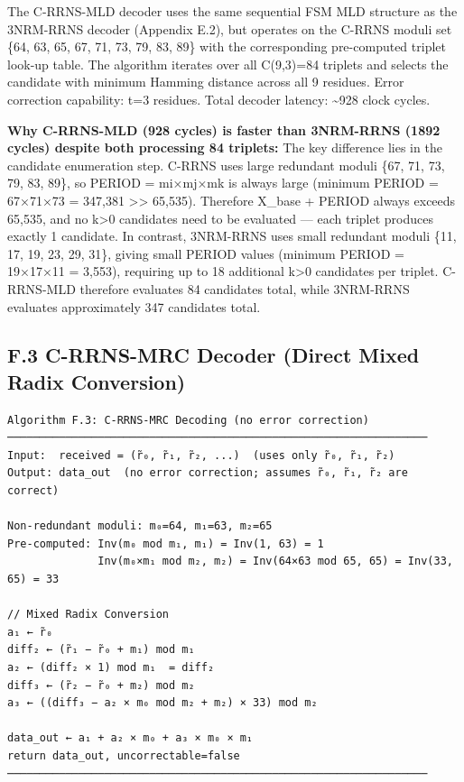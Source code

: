 \documentclass[
  english,
  12pt,
]{report}
\begin{document}
The C-RRNS-MLD decoder uses the same sequential FSM MLD structure as the
3NRM-RRNS decoder (Appendix E.2), but operates on the C-RRNS moduli set
\{64, 63, 65, 67, 71, 73, 79, 83, 89\} with the corresponding
pre-computed triplet look-up table. The algorithm iterates over all
C(9,3)=84 triplets and selects the candidate with minimum Hamming
distance across all 9 residues. Error correction capability: t=3
residues. Total decoder latency: \textasciitilde928 clock cycles.

\textbf{Why C-RRNS-MLD (928 cycles) is faster than 3NRM-RRNS (1892
cycles) despite both processing 84 triplets:} The key difference lies in
the candidate enumeration step. C-RRNS uses large redundant moduli \{67,
71, 73, 79, 83, 89\}, so PERIOD = mi×mj×mk is always large (minimum
PERIOD = 67×71×73 = 347,381 \textgreater\textgreater{} 65,535).
Therefore X\_base + PERIOD always exceeds 65,535, and no k\textgreater0
candidates need to be evaluated --- each triplet produces exactly 1
candidate. In contrast, 3NRM-RRNS uses small redundant moduli \{11, 17,
19, 23, 29, 31\}, giving small PERIOD values (minimum PERIOD = 19×17×11
= 3,553), requiring up to 18 additional k\textgreater0 candidates per
triplet. C-RRNS-MLD therefore evaluates 84 candidates total, while
3NRM-RRNS evaluates approximately 347 candidates total.

\subsection{F.3 C-RRNS-MRC Decoder (Direct Mixed Radix
Conversion)}\label{f.3-c-rrns-mrc-decoder-direct-mixed-radix-conversion}

\begin{verbatim}
Algorithm F.3: C-RRNS-MRC Decoding (no error correction)
─────────────────────────────────────────────────────────────────
Input:  received = (r̃₀, r̃₁, r̃₂, ...)  (uses only r̃₀, r̃₁, r̃₂)
Output: data_out  (no error correction; assumes r̃₀, r̃₁, r̃₂ are correct)

Non-redundant moduli: m₀=64, m₁=63, m₂=65
Pre-computed: Inv(m₀ mod m₁, m₁) = Inv(1, 63) = 1
              Inv(m₀×m₁ mod m₂, m₂) = Inv(64×63 mod 65, 65) = Inv(33, 65) = 33

// Mixed Radix Conversion
a₁ ← r̃₀
diff₂ ← (r̃₁ − r̃₀ + m₁) mod m₁
a₂ ← (diff₂ × 1) mod m₁  = diff₂
diff₃ ← (r̃₂ − r̃₀ + m₂) mod m₂
a₃ ← ((diff₃ − a₂ × m₀ mod m₂ + m₂) × 33) mod m₂

data_out ← a₁ + a₂ × m₀ + a₃ × m₀ × m₁
return data_out, uncorrectable=false
─────────────────────────────────────────────────────────────────
\end{verbatim}
\end{document}
